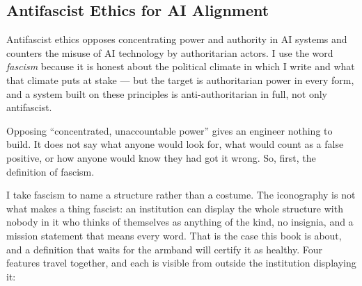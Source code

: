 \subsection{Antifascist Ethics for AI Alignment}
\label{sec:2.1.2}
Antifascist ethics opposes concentrating power and authority in AI systems and counters the misuse of AI technology by authoritarian actors. I use the word \emph{fascism} because it is honest about the political climate in which I write and what that climate puts at stake — but the target is authoritarian power in every form, and a system built on these principles is anti-authoritarian in full, not only antifascist.

Opposing “concentrated, unaccountable power” gives an engineer nothing to build. It does not say what anyone would look for, what would count as a false positive, or how anyone would know they had got it wrong. So, first, the definition of fascism.

I take fascism to name a structure rather than a costume. The iconography is not what makes a thing fascist: an institution can display the whole structure with nobody in it who thinks of themselves as anything of the kind, no insignia, and a mission statement that means every word. That is the case this book is about, and a definition that waits for the armband will certify it as healthy. Four features travel together, and each is visible from outside the institution displaying it:

